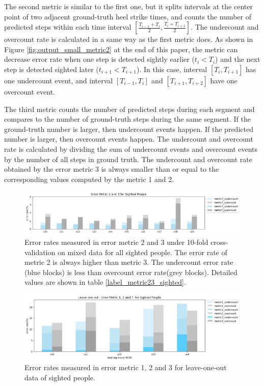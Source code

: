 \documentclass[11pt]{article}
\begin{document}
The second metric is similar to the first one,  but it  splits intervals at the center point of two adjacent ground-truth heel strike times, and counts the number of predicted steps within each time interval $[\frac{T_{i-1}+T_i}{2}, \frac{T_i+T_{i+1}}{2}]$. The undercount and overcount rate is calculated in a same way as the first metric does. As shown in Figure \ref{fig:output_small_metric2} at the end of this paper,  the metric can decrease error rate when one step is detected sightly earlier ($t_i<T_i$) and the next step is detected sighted later ($t_{i+1}<T_{i+1}$). In this case, interval $[T_i, T_{i+1}]$ has one undercount event, and interval $[T_{i-1}, T_i]$ and $[T_{i+1}, T_{i+2}]$ have one overcount event.

The third metric counts the number of predicted steps during each segment and compares to the number of ground-truth steps during the same segment. If the ground-truth number is larger, then undercount events happen. If the predicted number is larger, then overcount events happen. The undercount and overcount rate is calculated by dividing the sum of undercount events and overcount events by the number of all steps in ground truth. The undercount and overcount rate obtained by the error metric 3 is always smaller than or equal to the corresponding values computed by the metric 1 and 2.

\begin{figure}[ht]
\centering
\includegraphics[scale=0.5]{error_metric_23_na_10fold}
\caption{Error rates measured in error metric 2 and 3 under 10-fold cross-validation on mixed data for all sighted people. The error rate of metric 2 is always higher than metric 3. The undercount error rate (blue blocks) is less than overcount error rate(grey blocks). Detailed values are shown in table \ref{label_metric23_sighted}.}
\label{fig:error_metric_23_na_10fold}
\end{figure}

\begin{figure}[ht]
\centering
\includegraphics[scale=0.5]{error_metric_123_na_5fold}
\caption{Error rates measured in error metric 1, 2 and 3 for leave-one-out data of sighted people.}
\label{fig:error_metric_123_na_5fold}
\end{figure}
\end{document}
